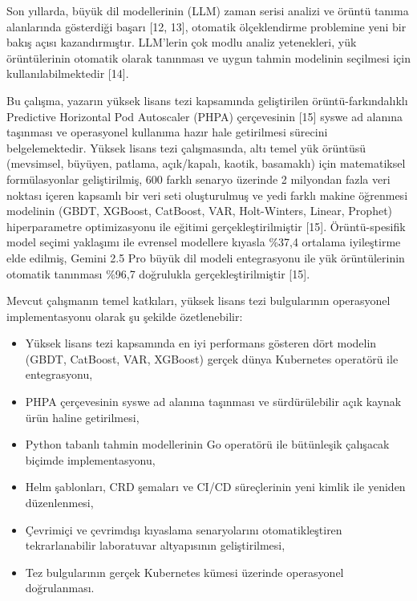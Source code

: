 \documentclass[12pt,a4paper]{article}
\begin{document}
Son yıllarda, büyük dil modellerinin (LLM) zaman serisi analizi ve örüntü tanıma alanlarında gösterdiği başarı [12, 13], otomatik ölçeklendirme problemine yeni bir bakış açısı kazandırmıştır. LLM'lerin çok modlu analiz yetenekleri, yük örüntülerinin otomatik olarak tanınması ve uygun tahmin modelinin seçilmesi için kullanılabilmektedir [14].

Bu çalışma, yazarın yüksek lisans tezi kapsamında geliştirilen örüntü-farkındalıklı Predictive Horizontal Pod Autoscaler (PHPA) çerçevesinin [15] syswe ad alanına taşınması ve operasyonel kullanıma hazır hale getirilmesi sürecini belgelemektedir. Yüksek lisans tezi çalışmasında, altı temel yük örüntüsü (mevsimsel, büyüyen, patlama, açık/kapalı, kaotik, basamaklı) için matematiksel formülasyonlar geliştirilmiş, 600 farklı senaryo üzerinde 2 milyondan fazla veri noktası içeren kapsamlı bir veri seti oluşturulmuş ve yedi farklı makine öğrenmesi modelinin (GBDT, XGBoost, CatBoost, VAR, Holt-Winters, Linear, Prophet) hiperparametre optimizasyonu ile eğitimi gerçekleştirilmiştir [15]. Örüntü-spesifik model seçimi yaklaşımı ile evrensel modellere kıyasla \%37,4 ortalama iyileştirme elde edilmiş, Gemini 2.5 Pro büyük dil modeli entegrasyonu ile yük örüntülerinin otomatik tanınması \%96,7 doğrulukla gerçekleştirilmiştir [15].

Mevcut çalışmanın temel katkıları, yüksek lisans tezi bulgularının operasyonel implementasyonu olarak şu şekilde özetlenebilir:

\begin{itemize}[noitemsep]
  \item Yüksek lisans tezi kapsamında en iyi performans gösteren dört modelin (GBDT, CatBoost, VAR, XGBoost) gerçek dünya Kubernetes operatörü ile entegrasyonu,
  \item PHPA çerçevesinin syswe ad alanına taşınması ve sürdürülebilir açık kaynak ürün haline getirilmesi,
  \item Python tabanlı tahmin modellerinin Go operatörü ile bütünleşik çalışacak biçimde implementasyonu,
  \item Helm şablonları, CRD şemaları ve CI/CD süreçlerinin yeni kimlik ile yeniden düzenlenmesi,
  \item Çevrimiçi ve çevrimdışı kıyaslama senaryolarını otomatikleştiren tekrarlanabilir laboratuvar altyapısının geliştirilmesi,
  \item Tez bulgularının gerçek Kubernetes kümesi üzerinde operasyonel doğrulanması.
\end{itemize}
\end{document}
